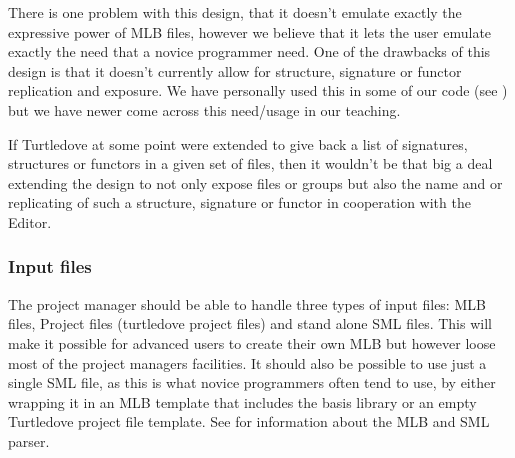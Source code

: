 There is one problem with this design, that it doesn't emulate exactly the
expressive power of MLB files, however we believe that it lets the user emulate
exactly the need that a novice programmer need. One of the drawbacks of this
design is that it doesn't currently allow for structure, signature or functor
replication and exposure. We have personally used this in some of our code (see
) but we have newer come across this need/usage in our
teaching.

If Turtledove at some point were extended to give back a list of
signatures, structures or functors in a given set of files, then it wouldn't be
that big a deal extending the design to not only expose files or groups but also
the name and or replicating of such a structure, signature or functor in
cooperation with the Editor.

\subsubsection{Input files}

The project manager should be able to handle three types of input files: MLB files,
Project files (turtledove project files) and stand alone SML files. This will
make it possible for advanced users to create their own MLB but however loose
most of the project managers facilities. It should also be possible to use just
a single SML file, as this is what novice programmers often tend to use, by either
wrapping it in an MLB template that includes the basis library or an empty Turtledove
project file template. See  for information about the
MLB and SML parser.


